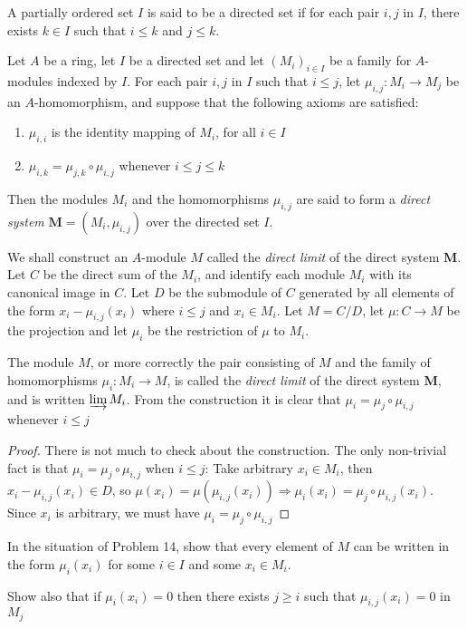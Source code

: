 \documentclass{solution}
\begin{document}
\begin{problem}
    A partially ordered set $I$ is said to be a directed set if for each pair $i, j$ in $I$, there exists $k \in I$ such that $i \le k$ and $j \le k$.

    Let $A$ be a ring, let $I$ be a directed set and let $(M_i)_{i \in I}$ be a family for $A$-modules indexed by $I$. For each pair $i, j$ in $I$ such that $i \le j$, let $\mu_{i, j}: M_i \rightarrow M_j$ be an $A$-homomorphism, and suppose that the following axioms are satisfied:
    \begin{enumerate}
        \item $\mu_{i, i}$ is the identity mapping of $M_i$, for all $i \in I$
        \item $\mu_{i, k} = \mu_{j, k} \circ \mu_{i, j}$ whenever $i \le j \le k$
    \end{enumerate}
    Then the modules $M_i$ and the homomorphisms $\mu_{i, j}$ are said to form a \textit{direct system} $\bm{M} = (M_i, \mu_{i, j})$ over the directed set $I$.

    We shall construct an $A$-module $M$ called the \textit{direct limit} of the direct system $\bm{M}$. Let $C$ be the direct sum of the $M_i$, and identify each module $M_i$ with its canonical image in $C$. Let $D$ be the submodule of $C$ generated by all elements of the form $x_i - \mu_{i, j}(x_i)$ where $i \le j$ and $x_i \in M_i$. Let $M = C / D$, let $\mu: C \rightarrow M$ be the projection and let $\mu_i$ be the restriction of $\mu$ to $M_i$.

    The module $M$, or more correctly the pair consisting of $M$ and the family of homomorphisms $\mu_i: M_i \rightarrow M$, is called the \textit{direct limit} of the direct system $\bm{M}$, and is written $\varinjlim M_i$. From the construction it is clear that $\mu_{i} = \mu_{j} \circ \mu_{i, j}$ whenever $i \le j$
\end{problem}

\begin{proof}
    There is not much to check about the construction. The only non-trivial fact is that $\mu_i = \mu_j \circ \mu_{i, j}$ when $i \le j$: Take arbitrary $x_i \in M_i$, then $x_i - \mu_{i, j}(x_i) \in D$, so $\mu(x_i) = \mu(\mu_{i, j} (x_i)) \Rightarrow \mu_i (x_i) = \mu_j \circ \mu_{i, j}(x_i)$. Since $x_i$ is arbitrary, we must have $\mu_i = \mu_j \circ \mu_{i, j}$
\end{proof}

\begin{problem}
    In the situation of Problem 14, show that every element of $M$ can be written in the form $\mu_i(x_i)$ for some $i \in I$ and some $x_i \in M_i$.

    Show also that if $\mu_i(x_i) = 0$ then there exists $j \ge i$ such that $\mu_{i, j}(x_i) = 0$ in $M_j$
\end{problem}
\end{document}

